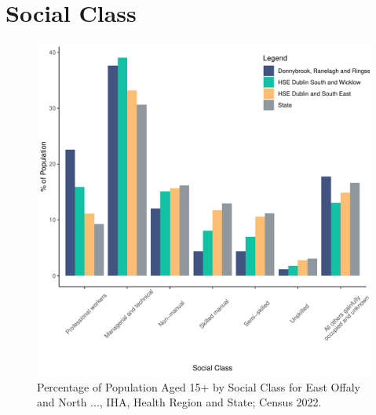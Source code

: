 \documentclass{article}
\begin{document}
\section{Social Class}\label{sect:SC}
\begin{figure}[H]
	\centering
	\includegraphics[width = 140mm]{../figures/SocialClassED.pdf}
	\caption{Percentage of Population Aged 15+ by Social Class for East Offaly and North ..., IHA, Health Region and State; Census 2022.}
	\label{fig:vbnv}
	\end{figure}
\end{document}
